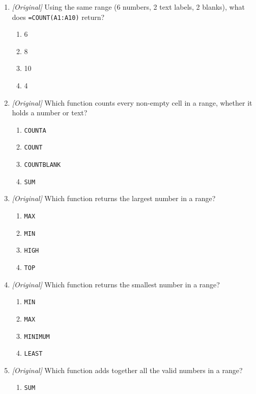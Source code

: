 \documentclass[11pt]{article}
\begin{document}
\begin{enumerate}[label=\textbf{Q\arabic*.}, leftmargin=*]
\begin{enumerate}[label=\Alph*.]
    \item 6
    \item 8
    \item 10
    \item 2
  \end{enumerate}
\item \textit{[Original]} Using the same range (6 numbers, 2 text labels, 2
  blanks), what does \texttt{=COUNT(A1:A10)} return?
  \begin{enumerate}[label=\Alph*.]
    \item 6
    \item 8
    \item 10
    \item 4
  \end{enumerate}
\item \textit{[Original]} Which function counts every non-empty cell in a
  range, whether it holds a number or text?
  \begin{enumerate}[label=\Alph*.]
    \item \texttt{COUNTA}
    \item \texttt{COUNT}
    \item \texttt{COUNTBLANK}
    \item \texttt{SUM}
  \end{enumerate}
\item \textit{[Original]} Which function returns the largest number in a
  range?
  \begin{enumerate}[label=\Alph*.]
    \item \texttt{MAX}
    \item \texttt{MIN}
    \item \texttt{HIGH}
    \item \texttt{TOP}
  \end{enumerate}
\item \textit{[Original]} Which function returns the smallest number in a
  range?
  \begin{enumerate}[label=\Alph*.]
    \item \texttt{MIN}
    \item \texttt{MAX}
    \item \texttt{MINIMUM}
    \item \texttt{LEAST}
  \end{enumerate}
\item \textit{[Original]} Which function adds together all the valid numbers
  in a range?
  \begin{enumerate}[label=\Alph*.]
    \item \texttt{SUM}

\end{enumerate}
\end{enumerate}
\end{document}
